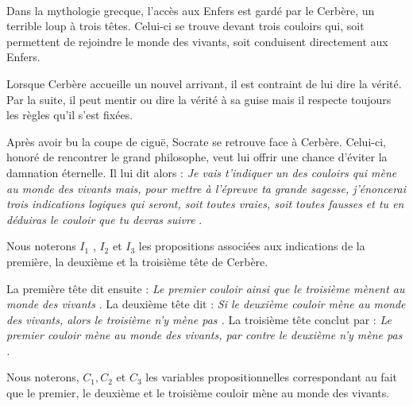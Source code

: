 \documentclass[11pt,a4paper]{article}
\begin{document}
\begin{Exercise}[title = {L'accès aux enfers}]\\
	Dans la mythologie grecque, l’accès aux Enfers est gardé par le Cerbère, un terrible loup à trois têtes. Celui-ci se trouve devant trois couloirs qui, soit
	permettent de rejoindre le monde des vivants, soit conduisent directement aux Enfers.

	Lorsque Cerbère accueille un nouvel arrivant, il est contraint de lui dire la vérité. Par la suite, il peut mentir ou dire la vérité à sa guise mais il respecte toujours les règles qu’il s’est fixées.

	Après avoir bu la coupe de ciguë, Socrate se retrouve face à Cerbère. Celui-ci, honoré de rencontrer le grand philosophe, veut lui offrir une chance d’éviter la damnation éternelle. Il lui dit alors : \og{} \textit{Je vais t’indiquer un des couloirs qui mène au monde des vivants mais, pour mettre à l’épreuve ta grande sagesse, j’énoncerai trois indications logiques qui seront, soit toutes vraies, soit toutes fausses et tu en déduiras le couloir que tu devras suivre} \fg{}.

	Nous noterons $I_1$ , $I_2$ et $I_3$ les propositions associées aux indications de la première, la deuxième et la troisième tête de Cerbère.

	\NRet \smallskip
	La première tête dit ensuite : \og{} \textit{Le premier couloir ainsi que le troisième mènent au monde des vivants} \fg{}.
	La deuxième tête dit : \og{} \textit{Si le deuxième couloir mène au monde des vivants, alors le troisième n'y mène pas \fg{}.}
	La troisième tête conclut par : \og{} \textit{Le premier couloir mène au monde des vivants, par contre le deuxième n'y mène pas \fg{}.}

	Nous noterons, $C_1, C_2$ et $C_3$ les variables propositionnelles correspondant au fait que le premier, le deuxième et le troisième couloir mène au monde des vivants.


\end{Exercise}
\end{document}
